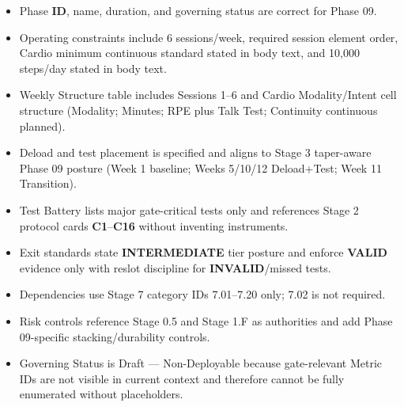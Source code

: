 \documentclass[10pt]{article}
\begin{document}
\begin{itemize}
\item[] [ ] Phase \textbf{ID}, name, duration, and governing status are correct for Phase 09.
\item[] [ ] Operating constraints include 6 sessions/week, required session element order, Cardio minimum continuous standard stated in body text, and 10,000 steps/day stated in body text.
\item[] [ ] Weekly Structure table includes Sessions 1–6 and Cardio Modality/Intent cell structure (Modality; Minutes; RPE plus Talk Test; Continuity continuous planned).
\item[] [ ] Deload and test placement is specified and aligns to Stage 3 taper-aware Phase 09 posture (Week 1 baseline; Weeks 5/10/12 Deload+Test; Week 11 Transition).
\item[] [ ] Test Battery lists major gate-critical tests only and references Stage 2 protocol cards \textbf{C1}–\textbf{C16} without inventing instruments.
\item[] [ ] Exit standards state \textbf{INTERMEDIATE} tier posture and enforce \textbf{VALID} evidence only with reslot discipline for \textbf{INVALID}/missed tests.
\item[] [ ] Dependencies use Stage 7 category IDs 7.01–7.20 only; 7.02 is not required.
\item[] [ ] Risk controls reference Stage 0.5 and Stage 1.F as authorities and add Phase 09-specific stacking/durability controls.
\item[] [ ] Governing Status is Draft — Non-Deployable because gate-relevant Metric IDs are not visible in current context and therefore cannot be fully enumerated without placeholders.
\end{itemize}
\end{document}
